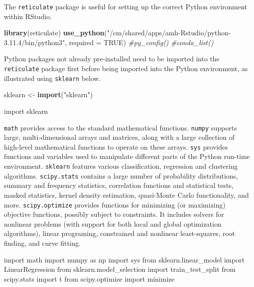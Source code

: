 \documentclass[12pt, twoside]{amherstthesis}
\newenvironment{Shaded}{\begin{snugshade}}{\end{snugshade}}
\newcommand{\AttributeTok}[1]{\textcolor[rgb]{0.13,0.29,0.53}{#1}}
\newcommand{\CommentTok}[1]{\textcolor[rgb]{0.56,0.35,0.01}{\textit{#1}}}
\newcommand{\ConstantTok}[1]{\textcolor[rgb]{0.56,0.35,0.01}{#1}}
\newcommand{\FunctionTok}[1]{\textcolor[rgb]{0.13,0.29,0.53}{\textbf{#1}}}
\newcommand{\ImportTok}[1]{#1}
\newcommand{\NormalTok}[1]{#1}
\newcommand{\OtherTok}[1]{\textcolor[rgb]{0.56,0.35,0.01}{#1}}
\newcommand{\StringTok}[1]{\textcolor[rgb]{0.31,0.60,0.02}{#1}}
\begin{document}
The \texttt{reticulate} package is useful for setting up the correct Python environment within RStudio.
\begin{Shaded}
\begin{Highlighting}[]
\FunctionTok{library}\NormalTok{(reticulate)}
\FunctionTok{use\_python}\NormalTok{(}\StringTok{"/cm/shared/apps/amh{-}Rstudio/python{-}3.11.4/bin/python3"}\NormalTok{, }
           \AttributeTok{required =} \ConstantTok{TRUE}\NormalTok{)}
\CommentTok{\#py\_config()}
\CommentTok{\#conda\_list()}
\end{Highlighting}
\end{Shaded}
\noindent Python packages not already pre-installed need to be imported into the \texttt{reticulate} package first before being imported into the Python environment, as illustrated using \texttt{sklearn} below.
\begin{Shaded}
\begin{Highlighting}[]
\NormalTok{sklearn }\OtherTok{\textless{}{-}} \FunctionTok{import}\NormalTok{(}\StringTok{"sklearn"}\NormalTok{)}
\end{Highlighting}
\end{Shaded}
\begin{Shaded}
\begin{Highlighting}[]
\ImportTok{import}\NormalTok{ sklearn}
\end{Highlighting}
\end{Shaded}
\noindent \texttt{math} provides access to the standard mathematical functions. \texttt{numpy} supports large, multi-dimensional arrays and matrices, along with a large collection of high-level mathematical functions to operate on these arrays. \texttt{sys} provides functions and variables used to manipulate different parts of the Python run-time environment. \texttt{sklearn} features various classification, regression and clustering algorithms. \texttt{scipy.stats} contains a large number of probability distributions, summary and frequency statistics, correlation functions and statistical tests, masked statistics, kernel density estimation, quasi-Monte Carlo functionality, and more. \texttt{scipy.optimize} provides functions for minimizing (or maximizing) objective functions, possibly subject to constraints. It includes solvers for nonlinear problems (with support for both local and global optimization algorithms), linear programing, constrained and nonlinear least-squares, root finding, and curve fitting.
\begin{Shaded}
\begin{Highlighting}[]
\ImportTok{import}\NormalTok{ math}
\ImportTok{import}\NormalTok{ numpy }\ImportTok{as}\NormalTok{ np}
\ImportTok{import}\NormalTok{ sys}
\ImportTok{from}\NormalTok{ sklearn.linear\_model }\ImportTok{import}\NormalTok{ LinearRegression}
\ImportTok{from}\NormalTok{ sklearn.model\_selection }\ImportTok{import}\NormalTok{ train\_test\_split}
\ImportTok{from}\NormalTok{ scipy.stats }\ImportTok{import}\NormalTok{ t}
\ImportTok{from}\NormalTok{ scipy.optimize }\ImportTok{import}\NormalTok{ minimize}
\end{Highlighting}
\end{Shaded}
\end{document}
